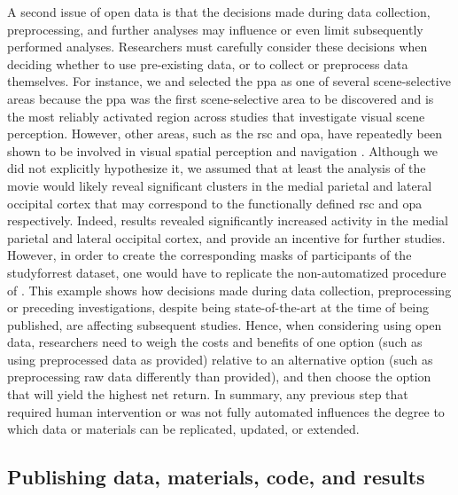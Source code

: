 A second issue of open data is that the decisions made during data collection,
preprocessing, and further analyses may influence or even limit subsequently
performed analyses.
%
Researchers must carefully consider these decisions when deciding whether to use
pre-existing data, or to collect or preprocess data themselves.
%
For instance, we and \citet{sengupta2016extension} selected the \ac{ppa} as one
of several scene-selective areas because the \ac{ppa} was the first
scene-selective area to be discovered and is the most reliably activated region
across studies that investigate visual scene perception.
%
However, other areas, such as the \ac{rsc} and \ac{opa}, have repeatedly been
shown to be involved in visual spatial perception and navigation
\citep{chrastil2018heterogeneity, bettencourt2013role, dilks2013occipital,
epstein2019scene}.
%
Although we did not explicitly hypothesize it, we assumed that at least the
analysis of the movie would likely reveal significant clusters in the medial
parietal and lateral occipital cortex that may correspond to the functionally
defined \ac{rsc} and \ac{opa} respectively.
%
Indeed, results revealed significantly increased activity in the medial parietal
and lateral occipital cortex, and provide an incentive for further studies.
However, in order to create the corresponding masks of participants of the
studyforrest dataset, one would have to replicate the non-automatized procedure
of \citet{sengupta2016extension}.
%
This example shows how decisions made during data collection, preprocessing or
preceding investigations, despite being state-of-the-art at the time of being
published, are affecting subsequent studies.
Hence, when considering using open data, researchers need to weigh the costs and
benefits of one option (such as using preprocessed data as provided) relative to
an alternative option (such as preprocessing raw data differently than
provided), and then choose the option that will yield the highest net return.
%
In summary, any previous step that required human intervention or was not fully
automated influences the degree to which data or materials can be replicated,
updated, or extended.




\subsection{Publishing data, materials, code, and results}

